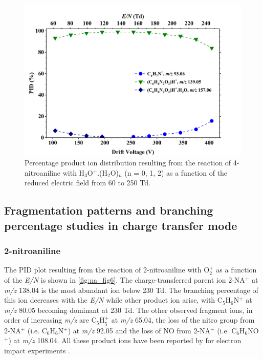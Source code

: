\begin{figure}%
\centering
\includegraphics[height=0.35\textheight]{pics/nitros_paper_5.png}
\caption{Percentage product ion distribution resulting from the reaction of 4-nitroaniline with H$_3$O$^+$.(H$_2$O)$_n$ (n = 0, 1, 2) as a function of the reduced electric field from 60 to 250 Td.}
\label{fig:na_fig5}
\end{figure}

\subsection{Fragmentation patterns and branching percentage studies in charge transfer mode}

\subsubsection{2-nitroaniline}
The PID plot resulting from the reaction of 2-nitroaniline with O$_2^+$ as a function of the \textit{E/N} is shown in  \autoref{fig:na_fig6}.
The charge-transferred parent ion 2-NA$^+$ at \textit{m/z} 138.04 is the most abundant ion below 230 Td.
The branching percentage of this ion decreases with the \textit{E/N} while other product ion arise, with C$_5$H$_6$N$^+$ at \textit{m/z} 80.05 becoming dominant at 230 Td. 
The other observed fragment ions, in order of increasing \textit{m/z} are C$_5$H$_5^+$ at \textit{m/z} 65.04, 
the loss of the nitro group from 2-NA$^+$ (i.e. C$_6$H$_6$N$^+$) at \textit{m/z} 92.05 and
the loss of NO from 2-NA$^+$ (i.e. C$_6$H$_6$NO$^+$) at \textit{m/z} 108.04.
All these product ions have been reported by \citeauthor{beynon1959some} for electron impact experiments   \cite{beynon1959some}.

